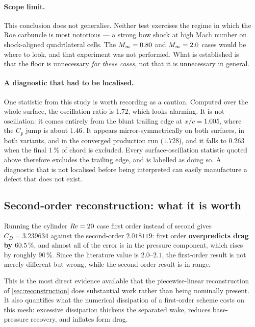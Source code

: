\paragraph{Scope limit.} This conclusion does not generalise. Neither test
exercises the regime in which the Roe carbuncle is most notorious --- a strong bow
shock at high Mach number on shock-aligned quadrilateral cells. The $M_\infty=0.80$
and $M_\infty=2.0$ cases would be where to look, and that experiment was not
performed. What is established is that the floor is unnecessary \emph{for these
cases}, not that it is unnecessary in general.

\paragraph{A diagnostic that had to be localised.} One statistic from this study is
worth recording as a caution. Computed over the whole surface, the oscillation
ratio is $1.72$, which looks alarming. It is not oscillation: it comes entirely
from the blunt trailing edge at $x/c=1.005$, where the $C_p$ jump is about $1.46$.
It appears mirror-symmetrically on both surfaces, in both variants, and in the
converged production run ($1.728$), and it falls to $0.263$ when the final $1\,\%$
of chord is excluded. Every surface-oscillation statistic quoted above therefore
excludes the trailing edge, and is labelled as doing so. A diagnostic that is not
localised before being interpreted can easily manufacture a defect that does not
exist.

\subsection{Second-order reconstruction: what it is worth}
\label{sec:ordersens}

Running the cylinder $\mathit{Re}=20$ case first order instead of second gives
$C_D=\num{3.239634}$ against the second-order $\num{2.018119}$: first order
\textbf{overpredicts drag by $60.5\,\%$}, and almost all of the error is in the
pressure component, which rises by roughly $90\,\%$. Since the literature value is
$2.0$--$2.1$, the first-order result is not merely different but wrong, while the
second-order result is in range.

This is the most direct evidence available that the piecewise-linear
reconstruction of \cref{sec:reconstruction} does substantial work rather than
being nominally present. It also quantifies what the numerical dissipation of a
first-order scheme costs on this mesh: excessive dissipation thickens the
separated wake, reduces base-pressure recovery, and inflates form drag.

